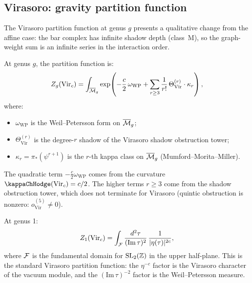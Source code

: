\subsection{Virasoro: gravity partition function}

\begin{construction}
The Virasoro partition function at genus $g$ presents a qualitative
change from the affine case: the bar complex has infinite shadow depth
(class~M), so the graph-weight sum is an infinite series in the
interaction order.

At genus $g$, the partition function is:
\begin{equation}
Z_g(\mathrm{Vir}_c)
 = \int_{\overline{\mathcal{M}}_g}
 \exp\!\left(
 -\frac{c}{2} \, \omega_{\mathrm{WP}}
 + \sum_{r \geq 3}
 \frac{1}{r!}\, \Theta^{(r)}_{\mathrm{Vir}} \cdot \kappa_r
 \right),
\end{equation}
where:
\begin{itemize}
\item $\omega_{\mathrm{WP}}$ is the Weil--Petersson form on
 $\overline{\mathcal{M}}_g$;
\item $\Theta^{(r)}_{\mathrm{Vir}}$ is the degree-$r$ shadow of the
 Virasoro shadow obstruction tower;
\item $\kappa_r = \pi_*(\psi^{r+1})$ is the $r$-th kappa class on
 $\overline{\mathcal{M}}_g$ (Mumford--Morita--Miller).
\end{itemize}

The quadratic term $-\frac{c}{2} \omega_{\mathrm{WP}}$ comes from the
curvature $\kappaChHodge(\mathrm{Vir}_c) = c/2$. The higher terms $r \geq 3$
come from the shadow obstruction tower, which does not terminate for Virasoro
(quintic obstruction is nonzero:
$o^{(5)}_{\mathrm{Vir}} \neq 0$).
\end{construction}

\begin{proposition}
At genus 1:
\[
Z_1(\mathrm{Vir}_c) = \int_{\mathcal{F}}
 \frac{d^2 \tau}{(\mathrm{Im}\, \tau)^2}
 \, \frac{1}{|\eta(\tau)|^{2c}},
\]
where $\mathcal{F}$ is the fundamental domain for $\mathrm{SL}_2(\mathbb{Z})$ in the
upper half-plane. This is the standard Virasoro partition function: the
$\eta^{-c}$ factor is the Virasoro character of the vacuum module, and
the $(\mathrm{Im}\, \tau)^{-2}$ factor is the Weil--Petersson measure.
\end{proposition}

